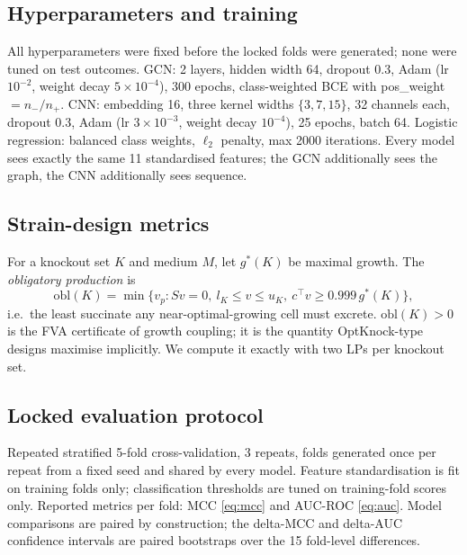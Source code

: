 \documentclass[12pt]{article}
\begin{document}
\subsection{Hyperparameters and training}
\label{sec:hyper}
All hyperparameters were fixed before the locked folds were generated;
none were tuned on test outcomes. GCN: 2 layers, hidden width 64, dropout
0.3, Adam (lr $10^{-2}$, weight decay $5\times10^{-4}$), 300 epochs,
class-weighted BCE with pos\_weight $=n_{-}/n_{+}$. CNN: embedding 16,
three kernel widths $\{3,7,15\}$, 32 channels each, dropout 0.3, Adam
(lr $3\times10^{-3}$, weight decay $10^{-4}$), 25 epochs, batch 64.
Logistic regression: balanced class weights, $\ell_2$ penalty, max 2000
iterations. Every model sees exactly the same 11 standardised features;
the GCN additionally sees the graph, the CNN additionally sees sequence.

\subsection{Strain-design metrics}
\label{sec:methods-sd}
For a knockout set $K$ and medium $M$, let $g^{*}(K)$ be maximal growth.
The \emph{obligatory production} is
\begin{equation}
\mathrm{obl}(K) = \min\{v_p : Sv=0,\ l_K \le v \le u_K,\ c^{\top}v
\ge 0.999\, g^{*}(K)\},
\label{eq:obl}
\end{equation}
i.e.\ the least succinate any near-optimal-growing cell must excrete.
$\mathrm{obl}(K)>0$ is the FVA certificate of growth coupling; it is the
quantity OptKnock-type designs maximise implicitly. We compute it exactly
with two LPs per knockout set.

\subsection{Locked evaluation protocol}
Repeated stratified 5-fold cross-validation, 3 repeats, folds generated
once per repeat from a fixed seed and shared by every model. Feature
standardisation is fit on training folds only; classification thresholds
are tuned on training-fold scores only. Reported metrics per fold: MCC
\eqref{eq:mcc} and AUC-ROC \eqref{eq:auc}. Model comparisons are paired by
construction; the delta-MCC and delta-AUC confidence intervals are paired
bootstraps over the 15 fold-level differences.
\end{document}
